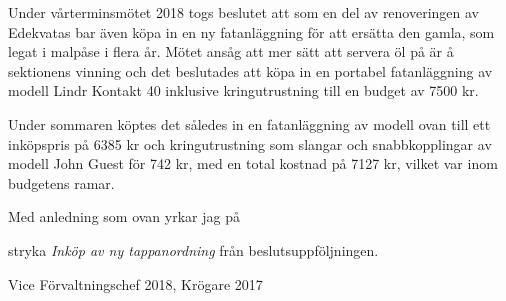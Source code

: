 \documentclass[../_main/handlingar.tex]{subfiles}
\begin{document}
Under vårterminsmötet 2018 togs beslutet att som en del av renoveringen av Edekvatas bar även köpa in en ny fatanläggning för att ersätta den gamla, som legat i malpåse i flera år. Mötet ansåg att mer sätt att servera öl på är å sektionens vinning och det beslutades att köpa in en portabel fatanläggning av modell Lindr Kontakt 40 inklusive kringutrustning till en budget av 7500 kr.

Under sommaren köptes det således in en fatanläggning av modell ovan till ett inköpspris på 6385 kr och kringutrustning som slangar och snabbkopplingar av modell John Guest för 742 kr, med en total kostnad på 7127 kr, vilket var inom budgetens ramar.

Med anledning som ovan yrkar jag på

\begin{attsatser}
    \att stryka \emph{Inköp av ny tappanordning} från beslutsuppföljningen.
\end{attsatser}

\begin{signatures}{1}
    \mvh
	\signature{Markus Rahne}{Vice Förvaltningschef 2018, Krögare 2017}
\end{signatures}
\end{document}
